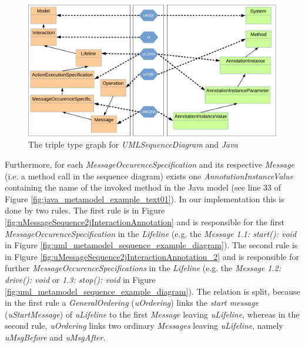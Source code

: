 \documentclass[tuberlin,cic,tc,english,noabntcite]{iiufrgs}
\begin{document}
\begin{figure}[H]
    \caption{The triple type graph for \emph{UMLSequenceDiagram} and \emph{Java}}
    \begin{center}
        \includegraphics[width=.7\textwidth]{umlSequenceDiagram2java_type}
    \end{center}
    \label{fig:umlSequenceDiagram2java_type}
\end{figure}

Furthermore, for each \emph{MessageOccurenceSpecification} and its respective \emph{Message} (i.e. a method call in the sequence diagram) exists one \emph{AnnotationInstanceValue} containing the name of the invoked method in the Java model (see line 33 of Figure \ref{fig:java_metamodel_example_text01}). In our implementation this is done by two rules. The first rule is in Figure \ref{fig:uMessageSequence2jInteractionAnnotation} and is responsible for the first \emph{MessageOccurenceSpecification} in the \emph{Lifeline} (e.g. the \emph{Message} \emph{1.1: start(): void} in Figure  \ref{fig:uml_metamodel_sequence_example_diagram}). The second rule is in Figure \ref{fig:uMessageSequence2jInteractionAnnotation_2} and is responsible for further \emph{MessageOccurenceSpecifications} in the \emph{Lifeline} (e.g. the \emph{Message} \emph{1.2: drive(): void} or \emph{1.3: stop(): void} in Figure  \ref{fig:uml_metamodel_sequence_example_diagram}). The relation is split, because in the first rule a \emph{GeneralOrdering} (\emph{uOrdering}) links the \emph{start message} (\emph{uStartMessage}) of \emph{uLifeline} to the first \emph{Message} leaving \emph{uLifeline}, whereas in the second rule, \emph{uOrdering} links two ordinary \emph{Messages} leaving \emph{uLifeline}, namely \emph{uMsgBefore} and \emph{uMsgAfter}.
\end{document}
